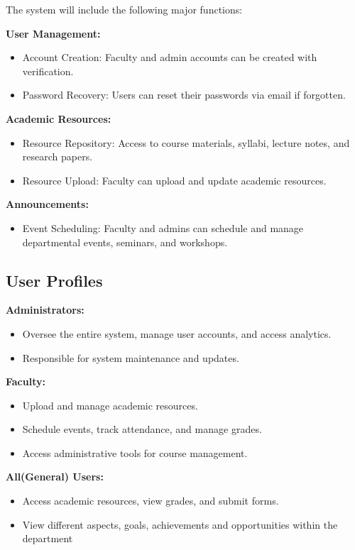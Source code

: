 \documentclass[11pt]{article}
\begin{document}
The system will include the following major functions:

\textbf{User Management:}
\begin{itemize}
    \item Account Creation: Faculty and admin accounts can be created with verification.
    \item Password Recovery: Users can reset their passwords via email if forgotten.
\end{itemize}

\textbf{Academic Resources:}
\begin{itemize}
    \item Resource Repository: Access to course materials, syllabi, lecture notes, and research papers.
    \item Resource Upload: Faculty can upload and update academic resources.
\end{itemize}

\textbf{Announcements:}
\begin{itemize}
    \item Event Scheduling: Faculty and admins can schedule and manage departmental events, seminars, and workshops.
\end{itemize}

\subsection{User Profiles}

\textbf{Administrators:}
\begin{itemize}
    \item Oversee the entire system, manage user accounts, and access analytics.
    \item Responsible for system maintenance and updates.
\end{itemize}

\textbf{Faculty:}
\begin{itemize}
    \item Upload and manage academic resources.
    \item Schedule events, track attendance, and manage grades.
    \item Access administrative tools for course management.
\end{itemize}

\textbf{All(General) Users:}
\begin{itemize}
    \item Access academic resources, view grades, and submit forms.
    \item View different aspects, goals, achievements and opportunities within the department
\end{itemize}
\end{document}
